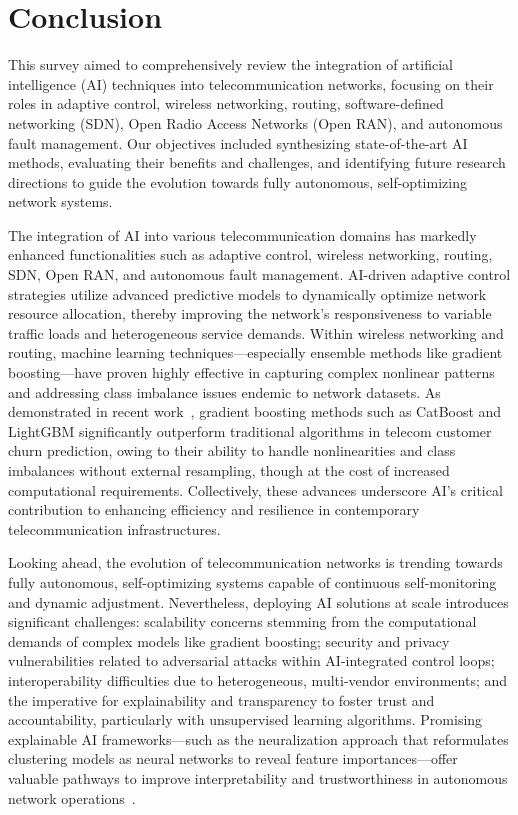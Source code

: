 \documentclass[sigconf]{acmart}
\begin{document}
\section{Conclusion}

This survey aimed to comprehensively review the integration of artificial intelligence (AI) techniques into telecommunication networks, focusing on their roles in adaptive control, wireless networking, routing, software-defined networking (SDN), Open Radio Access Networks (Open RAN), and autonomous fault management. Our objectives included synthesizing state-of-the-art AI methods, evaluating their benefits and challenges, and identifying future research directions to guide the evolution towards fully autonomous, self-optimizing network systems.

The integration of AI into various telecommunication domains has markedly enhanced functionalities such as adaptive control, wireless networking, routing, SDN, Open RAN, and autonomous fault management. AI-driven adaptive control strategies utilize advanced predictive models to dynamically optimize network resource allocation, thereby improving the network’s responsiveness to variable traffic loads and heterogeneous service demands. Within wireless networking and routing, machine learning techniques—especially ensemble methods like gradient boosting—have proven highly effective in capturing complex nonlinear patterns and addressing class imbalance issues endemic to network datasets. As demonstrated in recent work~\cite{ref17}, gradient boosting methods such as CatBoost and LightGBM significantly outperform traditional algorithms in telecom customer churn prediction, owing to their ability to handle nonlinearities and class imbalances without external resampling, though at the cost of increased computational requirements. Collectively, these advances underscore AI’s critical contribution to enhancing efficiency and resilience in contemporary telecommunication infrastructures.

Looking ahead, the evolution of telecommunication networks is trending towards fully autonomous, self-optimizing systems capable of continuous self-monitoring and dynamic adjustment. Nevertheless, deploying AI solutions at scale introduces significant challenges: scalability concerns stemming from the computational demands of complex models like gradient boosting; security and privacy vulnerabilities related to adversarial attacks within AI-integrated control loops; interoperability difficulties due to heterogeneous, multi-vendor environments; and the imperative for explainability and transparency to foster trust and accountability, particularly with unsupervised learning algorithms. Promising explainable AI frameworks—such as the neuralization approach that reformulates clustering models as neural networks to reveal feature importances—offer valuable pathways to improve interpretability and trustworthiness in autonomous network operations~\cite{ref45}.
\end{document}
